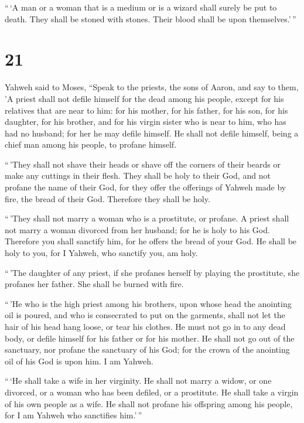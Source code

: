  ``\,`A man or a woman that is a medium or is a wizard
shall surely be put to death. They shall be stoned with stones. Their
blood shall be upon themselves.'\,''

\hypertarget{section-20}{%
\section{21}\label{section-20}}

 Yahweh said to Moses, ``Speak to the priests, the sons of
Aaron, and say to them, 'A priest shall not defile himself for the dead
among his people,  except for his relatives that are near
to him: for his mother, for his father, for his son, for his daughter,
for his brother,  and for his virgin sister who is near to
him, who has had no husband; for her he may defile himself.
 He shall not defile himself, being a chief man among his
people, to profane himself.

 ``\,'They shall not shave their heads or shave off the
corners of their beards or make any cuttings in their flesh.
 They shall be holy to their God, and not profane the name
of their God, for they offer the offerings of Yahweh made by fire, the
bread of their God. Therefore they shall be holy.

 ``\,'They shall not marry a woman who is a prostitute, or
profane. A priest shall not marry a woman divorced from her husband; for
he is holy to his God.  Therefore you shall sanctify him,
for he offers the bread of your God. He shall be holy to you, for I
Yahweh, who sanctify you, am holy.

 ``\,'The daughter of any priest, if she profanes herself
by playing the prostitute, she profanes her father. She shall be burned
with fire.

 ``\,'He who is the high priest among his brothers, upon
whose head the anointing oil is poured, and who is consecrated to put on
the garments, shall not let the hair of his head hang loose, or tear his
clothes.  He must not go in to any dead body, or defile
himself for his father or for his mother.  He shall not
go out of the sanctuary, nor profane the sanctuary of his God; for the
crown of the anointing oil of his God is upon him. I am Yahweh.

 ``\,`He shall take a wife in her virginity.
 He shall not marry a widow, or one divorced, or a woman
who has been defiled, or a prostitute. He shall take a virgin of his own
people as a wife.  He shall not profane his offspring
among his people, for I am Yahweh who sanctifies him.'\,''


